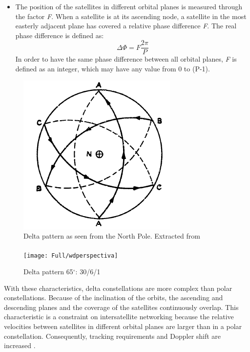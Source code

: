 \begin{itemize}
\item The position of the satellites in different orbital planes is measured through the factor \textit{F}. When a satellite is at its ascending node, a satellite in the most easterly adjacent plane has covered a relative phase difference \textit{F}. The real phase difference is defined as:
\begin{equation}
\Delta\Phi=F\frac{2\pi}{P}
\end{equation}
In order to have the same phase difference between all orbital planes, \textit{F} is defined as an integer, which may have any value from 0 to (P-1).

\end{itemize}

\begin{figure}[h!]
\centerline{\includegraphics[scale=0.75]{Full/walkerdeltaplanta.png}}
\caption{Delta pattern as seen from the North Pole. Extracted from \cite{Walker1977}}
\label{fig:delta pattern North Pole}
\end{figure}
\paragraph{}
\begin{figure}[h!]
\centerline{\texttt{[image: Full/wdperspectiva]}}
\caption{Delta pattern 65$^{\circ}$: 30/6/1}
\label{fig:delta pattern notation}
\end{figure}

With these characteristics, delta constellations are more complex than polar constellations. Because of the inclination of the orbits, the ascending and descending planes and the coverage of the satellites continuously overlap. This characteristic is a constraint on intersatellite networking because the relative velocities between satellites in different orbital planes are larger than in a polar constellation. Consequently, tracking requirements and Doppler shift are increased \cite{Wood1940}.

